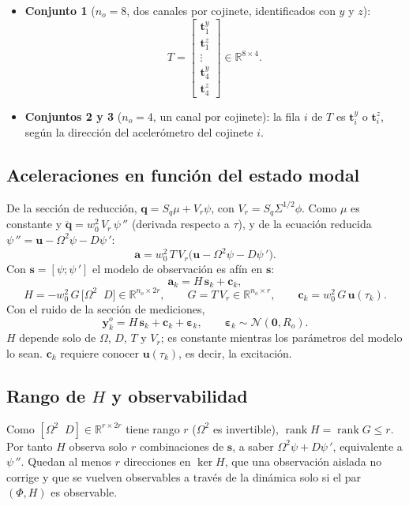 \begin{itemize}
\item \textbf{Conjunto 1} ($n_o=8$, dos canales por cojinete, identificados con $y$ y $z$):
\[
T=\begin{bmatrix}
\mathbf t_1^{y}\\ \mathbf t_1^{z}\\ \vdots\\ \mathbf t_4^{y}\\ \mathbf t_4^{z}
\end{bmatrix}\in\mathbb R^{8\times4}.
\]
\item \textbf{Conjuntos 2 y 3} ($n_o=4$, un canal por cojinete): la fila $i$ de $T$ es $\mathbf t_i^{y}$ o $\mathbf t_i^{z}$, según la dirección del acelerómetro del cojinete $i$.
\end{itemize}

\subsection{Aceleraciones en función del estado modal}

De la sección de reducción, $\mathbf q=S_q\mu+V_r\psi$, con $V_r=S_q\Sigma^{1/2}\phi$. Como $\mu$ es constante y $\ddot{\mathbf q}=w_0^2\,V_r\,\psi\,''$ (derivada respecto a $\tau$), y de la ecuación reducida $\psi\,''=\mathbf u-\Omega^2\psi-D\psi\,'$:
\[
\mathbf a=w_0^2\,T\,V_r\big(\mathbf u-\Omega^2\psi-D\psi\,'\big).
\]
Con $\mathbf s=[\psi;\psi\,']$ el modelo de observación es afín en $\mathbf s$:
\[
\mathbf a_k=H\,\mathbf s_k+\mathbf c_k,
\]
\[
H=-w_0^2\,G\,\big[\Omega^2\;\;D\big]\in\mathbb R^{n_o\times2r},\qquad
G=T\,V_r\in\mathbb R^{n_o\times r},\qquad
\mathbf c_k=w_0^2\,G\,\mathbf u(\tau_k).
\]
Con el ruido de la sección de mediciones,
\begin{equation}\label{eq:obs}
\mathbf y^o_k=H\,\mathbf s_k+\mathbf c_k+\boldsymbol\varepsilon_k,\qquad \boldsymbol\varepsilon_k\sim\mathcal N(\mathbf 0,R_o).
\end{equation}
$H$ depende solo de $\Omega$, $D$, $T$ y $V_r$; es constante mientras los parámetros del modelo lo sean. $\mathbf c_k$ requiere conocer $\mathbf u(\tau_k)$, es decir, la excitación.

\subsection{Rango de $H$ y observabilidad}

Como $[\Omega^2\;\;D]\in\mathbb R^{r\times2r}$ tiene rango $r$ ($\Omega^2$ es invertible), $\operatorname{rank}H=\operatorname{rank}G\le r$. Por tanto $H$ observa solo $r$ combinaciones de $\mathbf s$, a saber $\Omega^2\psi+D\psi\,'$, equivalente a $\psi\,''$. Quedan al menos $r$ direcciones en $\ker H$, que una observación aislada no corrige y que se vuelven observables a través de la dinámica solo si el par $(\Phi,H)$ es observable.

